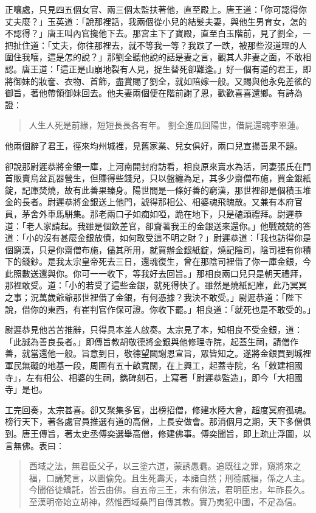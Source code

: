 正嚷處，只見四五個女官、兩三個太監扶著他，直至殿上。唐王道：「你可認得你丈夫麼？」玉英道：「說那裡話，我兩個從小兒的結髮夫妻，與他生男育女，怎的不認得？」唐王叫內官攙他下去。那宮主下了寶殿，直至白玉階前，見了劉全，一把扯住道：「丈夫，你往那裡去，就不等我一等？我跌了一跌，被那些沒道理的人圍住我嚷，這是怎的說？」那劉全聽他說的話是妻之言，觀其人非妻之面，不敢相認。唐王道：「這正是山崩地裂有人見，捉生替死卻難逢。」好一個有道的君王，即將御妹的妝奩、衣物、首飾，盡賞賜了劉全，就如陪嫁一般。又賜與他永免差徭的御旨，著他帶領御妹回去。他夫妻兩個便在階前謝了恩，歡歡喜喜還鄉。有詩為證：
\begin{quote}
人生人死是前緣，短短長長各有年。
劉全進瓜回陽世，借屍還魂李翠蓮。
\end{quote}

他兩個辭了君王，徑來均州城裡，見舊家業、兒女俱好，兩口兒宣揚善果不題。

卻說那尉遲恭將金銀一庫，上河南開封府訪看，相良原來賣水為活，同妻張氏在門首販賣烏盆瓦器營生，但賺得些錢兒，只以盤纏為足，其多少齋僧布施，買金銀紙錠，記庫焚燒，故有此善果臻身。陽世間是一條好善的窮漢，那世裡卻是個積玉堆金的長者。尉遲恭將金銀送上他門，諕得那相公、相婆魂飛魄散。又兼有本府官員，茅舍外車馬駢集。那老兩口子如痴如啞，跪在地下，只是磕頭禮拜。尉遲恭道：「老人家請起。我雖是個欽差官，卻齎著我王的金銀送來還你。」他戰兢兢的答道：「小的沒有甚麼金銀放債，如何敢受這不明之財？」尉遲恭道：「我也訪得你是個窮漢，只是你齋僧布施，儘其所用，就買辦金銀紙錠，燒記陰司，陰司裡有你積下的錢鈔。是我太宗皇帝死去三日，還魂復生，曾在那陰司裡借了你一庫金銀，今此照數送還與你。你可一一收下，等我好去回旨。」那相良兩口兒只是朝天禮拜，那裡敢受。道：「小的若受了這些金銀，就死得快了。雖然是燒紙記庫，此乃冥冥之事；況萬歲爺爺那世裡借了金銀，有何憑據？我決不敢受。」尉遲恭道：「陛下說，借你的東西，有崔判官作保可證。你收下罷。」相良道：「就死也是不敢受的。」

尉遲恭見他苦苦推辭，只得具本差人啟奏。太宗見了本，知相良不受金銀，道：「此誠為善良長者。」即傳旨教胡敬德將金銀與他修理寺院，起蓋生祠，請僧作善，就當還他一般。旨意到日，敬德望闕謝恩宣旨，眾皆知之。遂將金銀買到城裡軍民無礙的地基一段，周圍有五十畝寬闊，在上興工，起蓋寺院，名「敕建相國寺」，左有相公、相婆的生祠，鐫碑刻石，上寫著「尉遲恭監造」，即今「大相國寺」是也。

工完回奏，太宗甚喜。卻又聚集多官，出榜招僧，修建水陸大會，超度冥府孤魂。榜行天下，著各處官員推選有道的高僧，上長安做會。那消個月之期，天下多僧俱到。唐王傳旨，著太史丞傅奕選舉高僧，修建佛事。傅奕聞旨，即上疏止浮圖，以言無佛。表曰：
\begin{quote}
西域之法，無君臣父子，以三塗六道，蒙誘愚蠢。追既往之罪，窺將來之福，口誦梵言，以圖偷免。且生死壽夭，本諸自然；刑德威福，係之人主。今聞俗徒矯託，皆云由佛。自五帝三王，未有佛法，君明臣忠，年祚長久。至漢明帝始立胡神，然惟西域桑門自傳其教。實乃夷犯中國，不足為信。
\end{quote}


